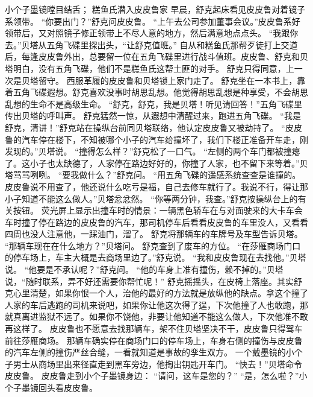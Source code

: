 \documentclass[a4paper,12pt,UTF8,twoside]{ctexbook}
\begin{document}
        小个子墨镜瞠目结舌； 
        糕鱼氏潜入皮皮鲁家   
        早晨，舒克起床看见皮皮鲁对着镜子系领带。 
        “你要出门？”舒克问皮皮鲁。 
        “上午去公司参加董事会议。”皮皮鲁系好领带后，又对照镜子修正领带上不尽人意的地方，然后满意地点点头。 
        “我跟你去。”贝塔从五角飞碟里探出头，“让舒克值班。” 
        自从和糕鱼氏那帮歹徒打上交道后，每逢皮皮鲁外出，总要留一位在五角飞碟里进行战斗值班。皮皮鲁、舒克和贝塔明白，没有五角飞碟，他们不是糕鱼氏这帮土匪的对手。 
        舒克只得同意，上一次是贝塔留守。 
        西服革履的皮皮鲁和贝塔锁上家门走了。 
        舒克坐在一本书上，靠着五角飞碟遐想。舒克喜欢没事时胡思乱想。他觉得胡思乱想是种享受，不会胡思乱想的生命不是高级生命。 
        “舒克，舒克，我是贝塔！听见请回答！”五角飞碟里传出贝塔的呼叫声。 
        舒克猛然一惊，从遐想中清醒过来，跑进五角飞碟。 
        “我是舒克，清讲！”舒克站在操纵台前同贝塔联络，他认定皮皮鲁又被劫持了。 
        “皮皮鲁的汽车停在楼下，不知被哪个小子的汽车给撞坏了，我们下楼正准备开车走，刚发现的。”贝塔说。 
        “撞得怎么样？”舒克松了一口气。 
        “左侧的两个车门都被撞瘪了。这小子也太缺德了，人家停在路边好好的，你撞了人家，也不留下来等着。”贝塔骂骂咧咧。 
        “要我做什么？”舒克问。 
        “用五角飞碟的遥感系统查查是谁撞的。皮皮鲁说不用查了，他还说什么吃亏是福，自己去修车就行了。我说不行，得让那小子知道不能这么做人。”贝塔忿忿然。 
        “你等两分钟，我查。”舒克按操纵台上的有关按钮。 
        荧光屏上显示出撞车时的情景：一辆黑色轿车在与对面驶来的大卡车会车时撞了停在路边的皮皮鲁的汽车，那司机停车后看看皮皮鲁的车里没人，又看看四周也没人注意他，一踩油门，溜了。 
        舒克将那辆车的车牌号及车型告诉贝塔。 
        “那辆车现在在什么地方？”贝塔问。 
        舒克查到了废车的方位。 
        “在莎雁商场门口的停车场上，车主大概是去商场里边了。”舒克说。 
        “我和皮皮鲁现在去找他。”贝塔说。 
        “他要是不承认呢？”舒克问。 
        “他的车身上准有撞伤，赖不掉的。”贝塔说，“随时联系，弄不好还需要你帮忙呢！” 
        舒克摇摇头，在皮椅上落座。其实舒克心里清楚，如果你恨一个人，治他的最好的方法就是放纵他的缺点。拿这个撞了人家的车后逃跑的司机来说吧，如果你让他这次得了逞，下次他撞了人也敢跑，那就真离进监狱不远了。如果你不饶他，非要让他知道不能这么做人，下次他准不敢再这样了。 
        皮皮鲁也不愿意去找那辆车，架不住贝塔坚决不干，皮皮鲁只得驾车前往莎雁商场。 
        那辆车确实停在商场门口的停车场上，车身右侧的撞伤与皮皮鲁的汽车左侧的撞伤严丝合缝，一看就知道是事故的孪生双方。 
        一个戴墨镜的小个子男士从商场里出来径直走到黑车旁边，他掏出钥匙开车门。 
        “快去！”贝塔命令皮皮鲁。 
        皮皮鲁走到小个子墨镜身边： 
        “请问，这车是您的？” 
        “是，怎么啦？”小个子墨镜回头看皮皮鲁。 
\end{document}
